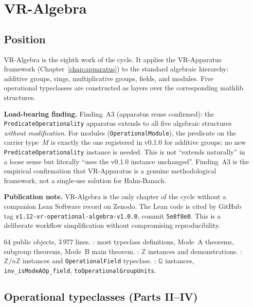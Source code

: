 \chapter{VR-Algebra}
\label{chap:algebra}

\section{Position}
\label{sec:algebra_position}

VR-Algebra is the eighth work of the cycle.  It applies the VR-Apparatus
framework (Chapter~\ref{chap:apparatus}) to the standard algebraic
hierarchy: additive groups, rings, multiplicative groups, fields, and
modules.  Five operational typeclasses are constructed as layers over
the corresponding mathlib structures.

\textbf{Load-bearing finding.} Finding~A3 (apparatus reuse confirmed):
the \texttt{PredicateOperationality} apparatus extends to all five
algebraic structures \emph{without modification}.  For modules
(\texttt{OperationalModule}), the predicate on the carrier type~$M$
is exactly the one registered in v0.1.0 for additive groups;
no new \texttt{PredicateOperationality} instance is needed.
This is not ``extends naturally'' in a loose sense but literally
``uses the v0.1.0 instance unchanged''.
Finding~A3 is the empirical confirmation that VR-Apparatus is a
genuine methodological framework, not a single-use solution for
Hahn-Banach.

\textbf{Publication note.} VR-Algebra is the only chapter of the cycle
without a companion Lean Software record on Zenodo.  The Lean code is
cited by GitHub tag \texttt{v1.12-vr-operational-algebra-v1.0.0},
commit \texttt{5e8f8e0}.  This is a deliberate workflow simplification
without compromising reproducibility.

64 public objects, 3\,977 lines.
\noindent\axiomprofile{[]}: most typeclass definitions, Mode~A theorems,
subgroup theorems, Mode~B main theorem.
\noindent\axiomprofile{[propext]}: $\mathbb{Z}$ instances and demonstrations.
\noindent{}: $\mathbb{Z}/n\mathbb{Z}$
instances and \texttt{OperationalField} typeclass.
\noindent{}: $\mathbb{Q}$
instances, \texttt{inv\_isModeAOp\_field}, \texttt{toOperationalGroupUnits}.

\section{Operational typeclasses (Parts II--IV)}
\label{sec:algebra_typeclasses}

